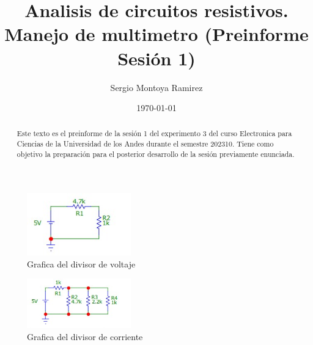\documentclass[a4paper, amsfonts, amssymb, amsmath, reprint, showkeys, nofootinbib, twoside]{revtex4-1}
\begin{document}
\title{Analisis de circuitos resistivos. Manejo de multimetro (Preinforme Sesión 1)}


\author{Sergio Montoya Ramirez}

  


\date{\today} %

\begin{abstract}

  Este texto es el preinforme de la sesión 1 del experimento 3 del curso Electronica para Ciencias de la Universidad de los Andes durante el semestre 202310. Tiene como objetivo la preparación para el posterior desarrollo de la sesión previamente enunciada.

\end{abstract}

\maketitle

\begin{figure}[h]
  \centering
  \includegraphics[width=0.4\textwidth]{Graficas/Circuito1.jpeg}
  \caption{Grafica del divisor de voltaje}
  \label{fig:divisor_voltaje}
\end{figure}	

\begin{figure}[h]
  \centering
  \includegraphics[width=0.4\textwidth]{Graficas/Circuito2.jpeg}
  \caption{Grafica del divisor de corriente}
  \label{fig:divisor_corriente}
\end{figure}
\end{document}

